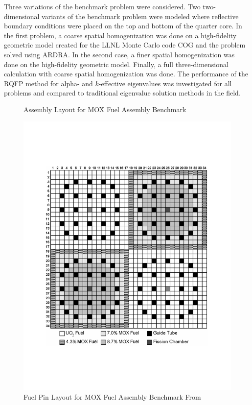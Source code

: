 Three variations of the benchmark problem were considered. Two two-dimensional variants of the benchmark problem were modeled where reflective boundary conditions were placed on the top and bottom of the quarter core. In the first problem, a coarse spatial homogenization was done on a high-fidelity geometric model created for the LLNL Monte Carlo code COG \cite{buck1993cog} and the problem solved using ARDRA. In the second case, a finer spatial homogenization was done on the high-fidelity geometric model. Finally, a full three-dimensional calculation with coarse spatial homogenization was done. The performance of the RQFP method for alpha- and $k$-effective eigenvalues was investigated for all problems and compared to traditional eigenvalue solution methods in the field.

\begin{figure}[!htbp]
\centering
\resizebox{0.55\textwidth}{!}{
	
	}
	\caption{Assembly Layout for MOX Fuel Assembly Benchmark}
	\label{fig:CoreConfig}
\end{figure}

\begin{figure}[!htbp]
\centering
  \includegraphics[trim=2cm 4cm 2cm 4cm,clip=true,width=.55\linewidth]{Figures/HigherDimEigen/FuelPinAssembly}
\caption{Fuel Pin Layout for MOX Fuel Assembly Benchmark From \cite{lewis2001benchmark}}
  \label{fig:FuelPinAssembly}
\end{figure}

